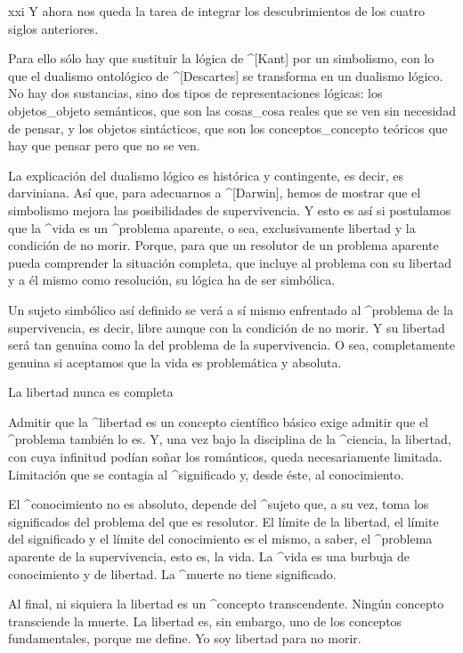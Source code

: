 \vfill\break

\siglo xxi Y ahora nos queda la tarea de integrar los
descubrimientos de los cuatro siglos anteriores.

\noindent
Para ello sólo hay que sustituir la lógica de ^[Kant] por un simbolismo,
con lo que el dualismo ontológico de ^[Descartes] se transforma en un
dualismo lógico. No hay dos sustancias, sino dos tipos de
representaciones lógicas: los objetos_{objeto} semánticos, que son las
cosas_{cosa} reales que se ven sin necesidad de pensar, y los objetos
sintácticos, que son los conceptos_{concepto} teóricos que hay que
pensar pero que no se ven.
\endpoints

La explicación del dualismo lógico es histórica y contingente, es decir,
es darviniana. Así que, para adecuarnos a ^[Darwin], hemos de mostrar
que el simbolismo mejora las posibilidades de supervivencia. Y esto es
así si postulamos que la ^{vida} es un ^{problema aparente}, o sea,
exclusivamente libertad y la condición de no morir. Porque, para que un
resolutor de un problema aparente pueda comprender la situación
completa, que incluye al problema con su libertad y a él mismo como
resolución, su lógica ha de ser simbólica.

Un sujeto simbólico así definido se verá a sí mismo enfrentado al
^{problema de la supervivencia}, es decir, libre aunque con la condición
de no morir. Y su libertad será tan genuina como la del problema de la
supervivencia. O sea, completamente genuina si aceptamos que la vida es
problemática y absoluta.


\Section La libertad nunca es completa

Admitir que la ^{libertad} es un concepto científico básico exige
admitir que el ^{problema} también lo es. Y, una vez bajo la disciplina
de la ^{ciencia}, la libertad, con cuya infinitud podían soñar los
románticos, queda necesariamente limitada. Limitación que se contagia al
^{significado} y, desde éste, al conocimiento.

El ^{conocimiento} no es absoluto, depende del ^{sujeto} que, a su vez,
toma los significados del problema del que es resolutor. El límite de la
libertad, el límite del significado y el límite del conocimiento es el
mismo, a saber, el ^{problema aparente} de la supervivencia, esto es, la
vida. La ^{vida} es una burbuja de conocimiento y de libertad. La
^{muerte} no tiene significado.

Al final, ni siquiera la libertad es un ^{concepto transcendente}.
Ningún concepto transciende la muerte. La libertad es, sin embargo, uno
de los conceptos fundamentales, porque me define. Yo soy libertad para
no morir.


